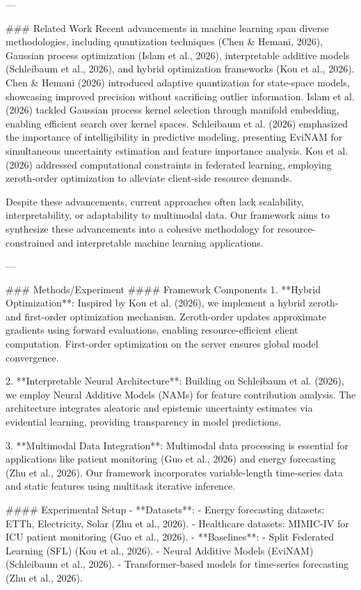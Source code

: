 ---

### Related Work  
Recent advancements in machine learning span diverse methodologies, including quantization techniques (Chen & Hemani, 2026), Gaussian process optimization (Islam et al., 2026), interpretable additive models (Schleibaum et al., 2026), and hybrid optimization frameworks (Kou et al., 2026). Chen & Hemani (2026) introduced adaptive quantization for state-space models, showcasing improved precision without sacrificing outlier information. Islam et al. (2026) tackled Gaussian process kernel selection through manifold embedding, enabling efficient search over kernel spaces. Schleibaum et al. (2026) emphasized the importance of intelligibility in predictive modeling, presenting EviNAM for simultaneous uncertainty estimation and feature importance analysis. Kou et al. (2026) addressed computational constraints in federated learning, employing zeroth-order optimization to alleviate client-side resource demands.

Despite these advancements, current approaches often lack scalability, interpretability, or adaptability to multimodal data. Our framework aims to synthesize these advancements into a cohesive methodology for resource-constrained and interpretable machine learning applications.

---

### Methods/Experiment  
#### Framework Components  
1. **Hybrid Optimization**:  
   Inspired by Kou et al. (2026), we implement a hybrid zeroth- and first-order optimization mechanism. Zeroth-order updates approximate gradients using forward evaluations, enabling resource-efficient client computation. First-order optimization on the server ensures global model convergence.

2. **Interpretable Neural Architecture**:  
   Building on Schleibaum et al. (2026), we employ Neural Additive Models (NAMs) for feature contribution analysis. The architecture integrates aleatoric and epistemic uncertainty estimates via evidential learning, providing transparency in model predictions.

3. **Multimodal Data Integration**:  
   Multimodal data processing is essential for applications like patient monitoring (Guo et al., 2026) and energy forecasting (Zhu et al., 2026). Our framework incorporates variable-length time-series data and static features using multitask iterative inference.

#### Experimental Setup  
- **Datasets**:  
   - Energy forecasting datasets: ETTh, Electricity, Solar (Zhu et al., 2026).
   - Healthcare datasets: MIMIC-IV for ICU patient monitoring (Guo et al., 2026).
- **Baselines**:  
   - Split Federated Learning (SFL) (Kou et al., 2026).  
   - Neural Additive Models (EviNAM) (Schleibaum et al., 2026).  
   - Transformer-based models for time-series forecasting (Zhu et al., 2026).  

